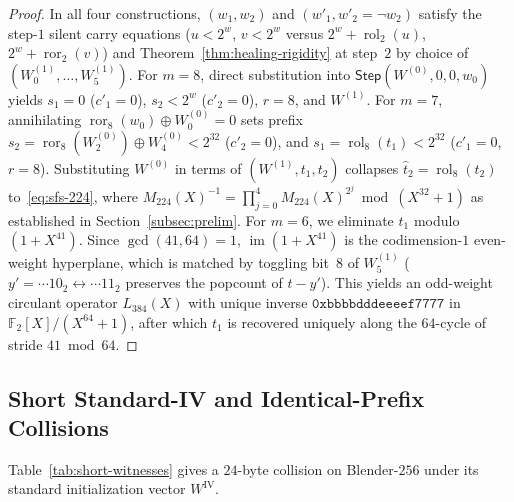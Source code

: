 \documentclass[11pt,a4paper]{article}
\theoremstyle{definition}
\theoremstyle{remark}
\newcommand{\Ftwo}{\mathbb{F}_2}
\newcommand{\ror}{\operatorname{ror}}
\newcommand{\rol}{\operatorname{rol}}
\newcommand{\im}{\operatorname{im}}
\begin{document}
\begin{proof}
In all four constructions, $(w_1, w_2)$ and $(w'_1, w'_2 = \neg w_2)$ satisfy the step-$1$ silent carry equations ($u < 2^w$, $v < 2^w$ versus $2^w + \rol_2(u)$, $2^w + \ror_2(v)$) and Theorem~\ref{thm:healing-rigidity} at step~$2$ by choice of $(W^{(1)}_0, \dots, W^{(1)}_5)$. For $m = 8$, direct substitution into $\mathsf{Step}(W^{(0)}, 0, 0, w_0)$ yields $s_1 = 0$ ($c'_1 = 0$), $s_2 < 2^w$ ($c'_2 = 0$), $r = 8$, and $W^{(1)}$. For $m = 7$, annihilating $\ror_8(w_0) \oplus W^{(0)}_0 = 0$ sets prefix $s_2 = \ror_8(W^{(0)}_2) \oplus W^{(0)}_4 < 2^{32}$ ($c'_2 = 0$), and $s_1 = \rol_8(t_1) < 2^{32}$ ($c'_1 = 0$, $r = 8$). Substituting $W^{(0)}$ in terms of $(W^{(1)}, t_1, t_2)$ collapses $\hat{t}_2 = \rol_8(t_2)$ to~\eqref{eq:sfs-224}, where $M_{224}(X)^{-1} = \prod_{j=0}^{4} M_{224}(X)^{2^j} \bmod (X^{32} + 1)$ as established in Section~\ref{subsec:prelim}. For $m = 6$, we eliminate $t_1$ modulo $(1 + X^{41})$. Since $\gcd(41, 64) = 1$, $\im(1 + X^{41})$ is the codimension-$1$ even-weight hyperplane, which is matched by toggling bit~$8$ of $W^{(1)}_5$ ($y' = \cdots 10_2 \leftrightarrow \cdots 11_2$ preserves the popcount of $t - y'$). This yields an odd-weight circulant operator $L_{384}(X)$ with unique inverse $\mathtt{0xbbbbdddeeeef7777}$ in $\Ftwo[X]/(X^{64} + 1)$, after which $t_1$ is recovered uniquely along the $64$-cycle of stride $41 \bmod 64$.
\end{proof}

\subsection{Short Standard-IV and Identical-Prefix Collisions}
\label{subsec:purec-inversion}
Table~\ref{tab:short-witnesses} gives a $24$-byte collision on Blender-$256$ under its standard initialization vector $W^{\mathrm{IV}}$.
\end{document}
